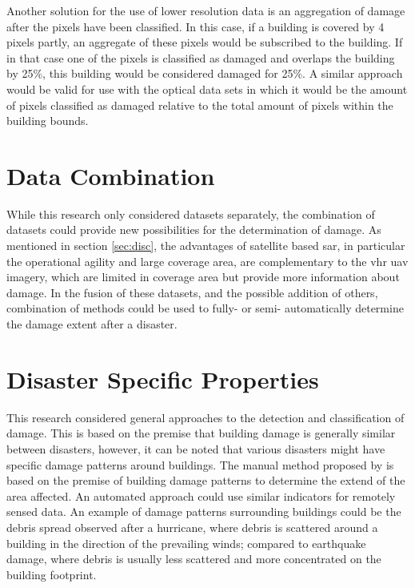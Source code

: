 \noindent Another solution for the use of lower resolution data is an aggregation of damage after the pixels have been classified. In this case, if a building is covered by 4 pixels partly, an aggregate of these pixels would be subscribed to the building. If in that case one of the pixels is classified as damaged and overlaps the building by 25\%, this building would be considered damaged for 25\%. A similar approach would be valid for use with the optical data sets in which it would be the amount of pixels classified as damaged relative to the total amount of pixels within the building bounds.

\section{Data Combination}
While this research only considered datasets separately, the combination of datasets could provide new possibilities for the determination of damage. As mentioned in section \ref{sec:disc}, the advantages of satellite based \ac{sar}, in particular the operational agility and large coverage area, are complementary to the \ac{vhr} \ac{uav} imagery, which are limited in coverage area but provide more information about damage. In the fusion of these datasets, and the possible addition of others, combination of methods could be used to fully- or semi- automatically determine the damage extent after a disaster. 

\section{Disaster Specific Properties}
This research considered general approaches to the detection and classification of damage. This is based on the premise that building damage is generally similar between disasters, however, it can be noted that various disasters might have specific damage patterns around buildings. The manual method proposed by \citet{Okada2000} is based on the premise of building damage patterns to determine the extend of the area affected. An automated approach could use similar indicators for remotely sensed data. An example of damage patterns surrounding buildings could be the debris spread observed after a hurricane, where debris is scattered around a building in the direction of the prevailing winds; compared to earthquake damage, where debris is usually less scattered and more concentrated on the building footprint.

